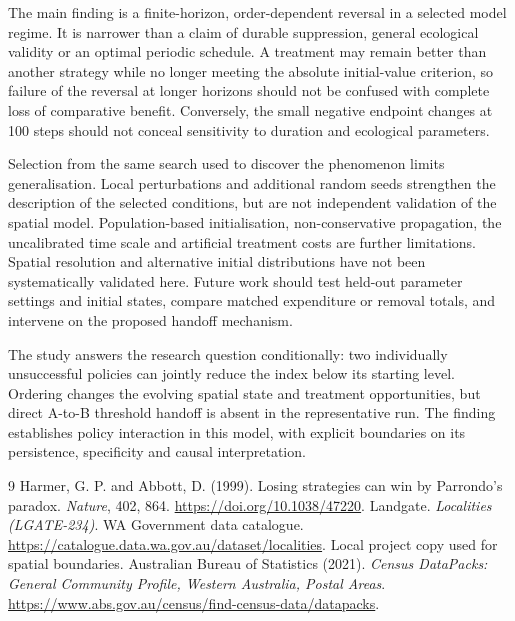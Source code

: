\documentclass[a4paper,11pt]{article}
\begin{document}
The main finding is a finite-horizon, order-dependent reversal in a selected model regime. It is narrower than a claim of durable suppression, general ecological validity or an optimal periodic schedule. A treatment may remain better than another strategy while no longer meeting the absolute initial-value criterion, so failure of the reversal at longer horizons should not be confused with complete loss of comparative benefit. Conversely, the small negative endpoint changes at 100 steps should not conceal sensitivity to duration and ecological parameters.

Selection from the same search used to discover the phenomenon limits generalisation. Local perturbations and additional random seeds strengthen the description of the selected conditions, but are not independent validation of the spatial model. Population-based initialisation, non-conservative propagation, the uncalibrated time scale and artificial treatment costs are further limitations. Spatial resolution and alternative initial distributions have not been systematically validated here. Future work should test held-out parameter settings and initial states, compare matched expenditure or removal totals, and intervene on the proposed handoff mechanism.

The study answers the research question conditionally: two individually unsuccessful policies can jointly reduce the index below its starting level. Ordering changes the evolving spatial state and treatment opportunities, but direct A-to-B threshold handoff is absent in the representative run. The finding establishes policy interaction in this model, with explicit boundaries on its persistence, specificity and causal interpretation.

\begin{thebibliography}{9}
 Harmer, G. P. and Abbott, D. (1999). Losing strategies can win by Parrondo's paradox. \emph{Nature}, 402, 864. \url{https://doi.org/10.1038/47220}.
 Landgate. \emph{Localities (LGATE-234)}. WA Government data catalogue. \url{https://catalogue.data.wa.gov.au/dataset/localities}. Local project copy used for spatial boundaries.
 Australian Bureau of Statistics (2021). \emph{Census DataPacks: General Community Profile, Western Australia, Postal Areas}. \url{https://www.abs.gov.au/census/find-census-data/datapacks}.
\end{thebibliography}
\end{document}
